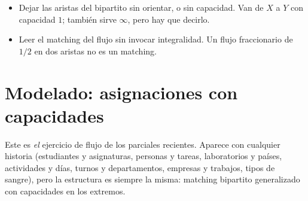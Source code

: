 \begin{trampa}
\begin{itemize}
  \item Dejar las aristas del bipartito sin orientar, o sin capacidad. Van de $X$ a $Y$ con capacidad $1$; también sirve $\infty$, pero hay que decirlo.
  \item Leer el matching del flujo sin invocar integralidad. Un flujo fraccionario de $1/2$ en dos aristas no es un matching.
\end{itemize}
\end{trampa}

\section{Modelado: asignaciones con capacidades}

Este es \emph{el} ejercicio de flujo de los parciales recientes. Aparece con cualquier historia (estudiantes y asignaturas, personas y tareas, laboratorios y países, actividades y días, turnos y departamentos, empresas y trabajos, tipos de sangre), pero la estructura es siempre la misma: matching bipartito generalizado con capacidades en los extremos.

\begin{center}
\end{center}

